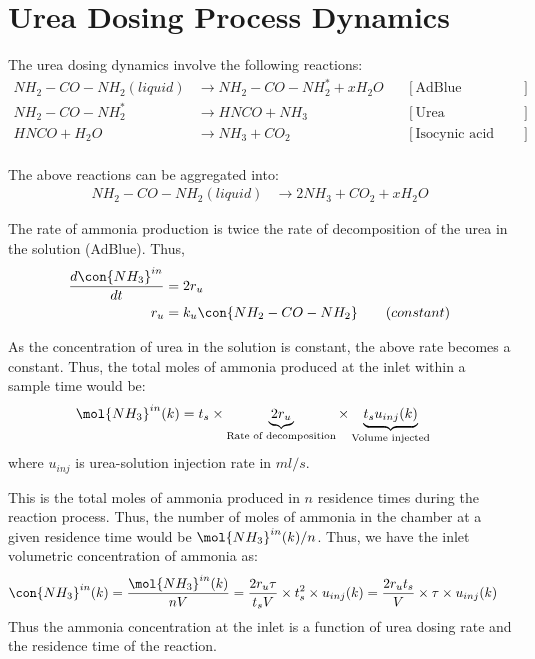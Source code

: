 \newpage
\section{Urea Dosing Process Dynamics}
The urea dosing dynamics involve the following reactions:
\begin{align*}
    NH_2 - CO - NH_2 (liquid) &\longrightarrow NH_2 - CO - NH_2^* + x H_2 O
                & &[\text{AdBlue evaporation}] \\
    NH_2 - CO - NH_2^*  &\longrightarrow  HNCO + NH_3
                & &[\text{Urea decomposition}] \\
    HNCO + H_2O &\longrightarrow NH_3 + CO_2
                & &[\text{Isocynic acid hydrolysis}] \\
\end{align*}

The above reactions can be aggregated into:
\begin{align*}
    NH_2 - CO - NH_2 (liquid) &\longrightarrow 2 NH_3 + CO_2 + x H_2 O
\end{align*}

The rate of ammonia production is twice the rate of decomposition of the urea in the solution (AdBlue). Thus,
\begin{align*}
    \frac{d \con{NH_3}^{in}}{dt} &= 2 r_{u}\\
    r_{u} &= k_{u} \con{NH_2 - CO - NH_2} \qquad (constant)
\end{align*}

As the concentration of urea in the solution is constant, the above rate becomes a constant. Thus, the total moles of
ammonia produced at the inlet within a sample time would be:
\begin{align*}
    \mol{NH_3}^{in} (k) &= t_s \times \underbrace{2 r_{u}}_{\text{Rate of decomposition}} \times \underbrace{t_s u_{inj} (k)}_{\text{Volume injected}}
\end{align*}
where $u_{inj}$ is urea-solution injection rate in $ml/s$.

This is the total moles of ammonia produced in $n$ residence times during the reaction process. Thus, the number of moles of ammonia in the chamber at a given residence time would be $\mol{NH_3}^{in}(k)/n$.
Thus, we have the inlet volumetric concentration of ammonia as:
\begin{align*}
    \con{NH_3}^{in} (k) &= \frac{\mol{NH_3}^{in} (k)}{nV}
                          = \frac{2 r_u \tau}{t_s V} \times t_s^2 \times u_{inj} (k)
                          = \frac{2 r_u t_s}{V} \times \tau \times u_{inj} (k)
\end{align*}
Thus the ammonia concentration at the inlet is a function of urea dosing rate and the residence time of the reaction.

